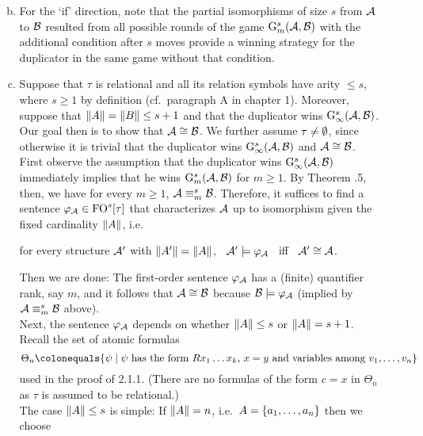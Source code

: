 \begin{enumerate}[1.]
\begin{enumerate}[(a)]
\begin{itemize}
\[\]
\end{itemize}
\item For the `if' direction, note that the partial isomorphisms of size $s$ from $\mathcal{A}$ to $\mathcal{B}$ resulted from all possible rounds of the game $\game[s]{m}(\strct{A}, \strct{B})$ with the additional condition after $s$ moves provide a winning strategy for the duplicator in the same game without that condition.
\item Suppose that $\tau$ is relational and all its relation symbols have arity $\leq s$, where $s \geq 1$ by definition (cf.\ paragraph A in chapter 1). Moreover, suppose that $\|A\| = \|B\| \leq s + 1$ and that the duplicator wins $\game[s]{\infty}(\strct{A}, \strct{B})$. Our goal then is to show that $\strct{A} \isom \strct{B}$. We further assume $\tau \neq \emptyset$, since otherwise it is trivial that the duplicator wins $\game[s]{\infty}(\strct{A}, \strct{B})$ and $\strct{A} \isom \strct{B}$.
\medskip\\
First observe the assumption that the duplicator wins $\game[s]{\infty}(\strct{A}, \strct{B})$ immediately implies that he wins $\game[s]{m}(\strct{A}, \strct{B})$ for $m \geq 1$. By Theorem \thesection.5, then, we have for every $m \geq 1$, $\strct{A} \equv[s]_m \strct{B}$. Therefore, it suffices to find a sentence $\varphi_\strct{A} \in \folog[s]\of{\tau}$ that characterizes $\mathcal{A}$ up to isomorphism given the fixed cardinality $\|A\|$, i.e.
\begin{center}
for every structure $\mathcal{A}'$ with $\|A'\| = \|A\|$, \ $\mathcal{A}' \models \varphi_{\mathcal{A}}$ \ iff \ $\strct{A}' \isom \strct{A}$.
\end{center}
Then we are done: The first-order sentence $\varphi_{\mathcal{A}}$ has a (finite) quantifier rank, say $m$, and it follows that $\strct{A} \isom \strct{B}$ because $\mathcal{B} \models \varphi_{\mathcal{A}}$ (implied by $\strct{A} \equv[s]_m \strct{B}$ above).
\medskip\\
Next, the sentence $\varphi_{\mathcal{A}}$ depends on whether $\|A\| \leq s$ or $\|A\| = s + 1$. Recall the set of atomic formulas
\[
\Theta_n \defas \sett{\psi}{\mathmode{\psi} has the form \mathmode{Rx_1 \etc x_k}, \mathmode{x = y} and variables among \mathmode{v_1, \etc, v_n}}
\]
used in the proof of 2.1.1. (There are no formulas of the form $c = x$ in $\Theta_n$ as $\tau$ is assumed to be relational.)
\medskip\\
The case $\|A\| \leq s$ is simple: If $\|A\| = n$, i.e.\ $A = {\{a_1, \ldots, a_n\}}$ then we choose

\end{enumerate}
\end{enumerate}
